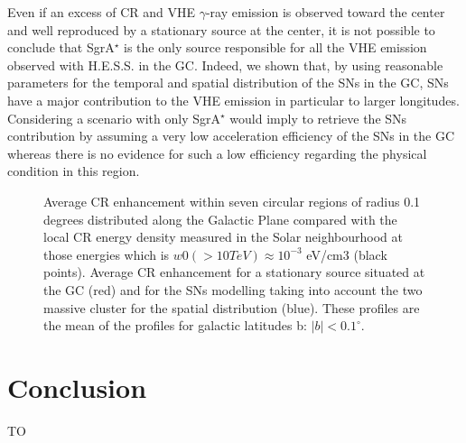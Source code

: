 \documentclass[a4paper,fleqn,usenatbib]{mnras}
\begin{document}
Even if an excess of CR and VHE $\gamma$-ray emission is observed toward the center and well reproduced by a stationary source at the center, it is not possible to conclude that SgrA$^\star$ is the only source responsible for all the VHE emission observed with H.E.S.S. in the GC. Indeed, we shown that, by using reasonable parameters for the temporal and spatial distribution of the SNs in the GC, SNs have a major contribution to the VHE emission in particular to larger longitudes. Considering a scenario with only SgrA$^\star$ would imply to retrieve the SNs contribution by assuming a very low acceleration efficiency of the SNs in the GC whereas there is no evidence for such a low efficiency regarding the physical condition in this region.
%
\begin{figure}
\centering
{}
\caption{Average CR enhancement within seven circular regions of radius 0.1 degrees distributed along the Galactic Plane \citep{2016Natur.531..476H}  compared with the local CR energy density measured in the Solar neighbourhood at those energies which is $w0(> 10 TeV) \approx 10^{-3}$ eV/cm3 (black points). Average CR enhancement for a stationary source situated at the GC (red) and for the SNs modelling taking into account the two massive cluster for the spatial distribution (blue). These profiles are the mean of the profiles for galactic latitudes b: $\rvert b \rvert <0.1^\circ$.}
\label{CRenhancement}
\end{figure}

\section{Conclusion}
TO
%
%
%
%
%
%





%
%



\bsp	%
\label{lastpage}
\end{document}
